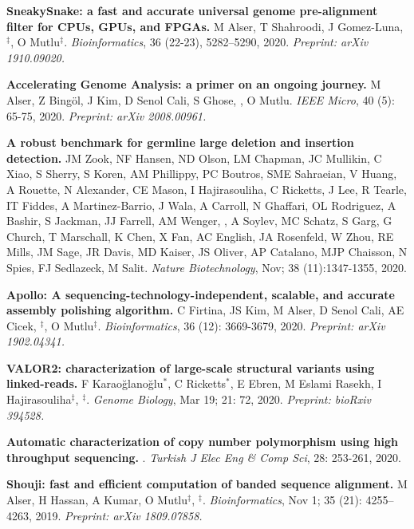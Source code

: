 \vspace{-.2cm}
{\bf SneakySnake: a fast and accurate universal genome pre-alignment filter for CPUs, GPUs, and FPGAs.} M Alser, T Shahroodi, J Gomez-Luna, \calkan{}$^\ddag$, O Mutlu$^\ddag$. {\it Bioinformatics}, 36 (22-23), 5282–5290, 2020. \textit {Preprint: arXiv 1910.09020.}

\vspace{-.2cm}
{\bf Accelerating Genome Analysis: a primer on an ongoing journey.} M Alser, Z Bingöl, J Kim, D Senol Cali, S Ghose, \calkan{}, O Mutlu. {\it IEEE Micro}, 40 (5): 65-75, 2020. \textit{Preprint: arXiv 2008.00961.}

\vspace{-.2cm}
 {\bf A robust benchmark for germline large deletion and insertion detection.}
 JM Zook, NF Hansen, ND Olson, LM Chapman, JC Mullikin, C Xiao, S Sherry, S Koren, AM Phillippy, PC Boutros, SME Sahraeian, V Huang, A Rouette, N Alexander, CE Mason, I Hajirasouliha, C Ricketts, J Lee, R Tearle, IT Fiddes, A Martinez-Barrio, J Wala, A Carroll, N Ghaffari, OL Rodriguez, A Bashir, S Jackman, JJ Farrell, AM Wenger, \calkan{}, A Soylev, MC Schatz, S Garg, G Church, T Marschall, K Chen, X Fan, AC English, JA Rosenfeld, W Zhou, RE Mills, JM Sage, JR Davis, MD Kaiser, JS Oliver, AP Catalano, MJP Chaisson, N Spies, FJ Sedlazeck, M Salit.
 {\it Nature Biotechnology}, Nov;  38 (11):1347-1355, 2020.
 
\vspace{-.2cm}
{\bf Apollo: A sequencing-technology-independent, scalable, and accurate assembly polishing algorithm.} C Firtina, JS Kim, M Alser, D Senol Cali, AE Cicek, \calkan{}$^\ddag$, O Mutlu$^\ddag$. {\it Bioinformatics}, 36 (12): 3669-3679, 2020.
\textit{Preprint: arXiv 1902.04341.}

\vspace{-.2cm}
 {\bf VALOR2: characterization of large-scale structural variants using linked-reads.}
 F Karaoğlanoğlu$^*$, C Ricketts$^*$, E Ebren, M Eslami Rasekh,  I Hajirasouliha$^\ddag$, \calkan{}$^\ddag$.
{\it Genome Biology}, Mar 19; 21: 72, 2020.  \textit{Preprint: bioRxiv 394528.}


   \vspace{-.2cm}
         {\bf Automatic characterization of copy number polymorphism using high throughput sequencing.}  \calkan{}. {\em Turkish J Elec Eng \& Comp Sci}, 28: 253-261, 2020.
         
\vspace{-.2cm}
{\bf Shouji: fast and efficient computation of banded sequence alignment.} M Alser, H Hassan, A Kumar, O Mutlu$^\ddag$, \calkan{}$^\ddag$.
{\em Bioinformatics}, Nov 1; 35 (21): 4255–4263, 2019. \textit{Preprint: arXiv 1809.07858.}



